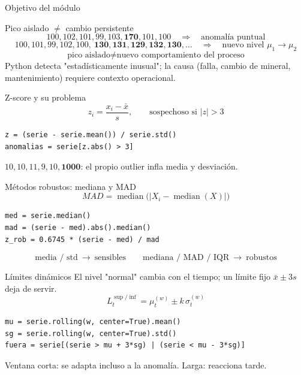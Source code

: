 



\begin{frame}{Objetivo del módulo}

\end{frame}

\begin{frame}{Pico aislado $\neq$ cambio persistente}
\[
100,102,101,99,103,\mathbf{170},101,100 \quad\Rightarrow\quad \text{anomalía puntual}
\]
\[
100,101,99,102,100,\ \mathbf{130,131,129,132,130,\dots} \quad\Rightarrow\quad \text{nuevo nivel } \mu_1\to\mu_2
\]
\[
\boxed{\text{pico aislado}\neq\text{nuevo comportamiento del proceso}}
\]
Python detecta "estadísticamente inusual"; la causa (falla, cambio de mineral,
mantenimiento) requiere contexto operacional.
\end{frame}

\begin{frame}[fragile]{Z-score y su problema}
\[
z_i=\frac{x_i-\bar{x}}{s},\qquad \text{sospechoso si } |z|>3
\]
\begin{lstlisting}
z = (serie - serie.mean()) / serie.std()
anomalias = serie[z.abs() > 3]
\end{lstlisting}
$10,10,11,9,10,\mathbf{1000}$: el propio outlier infla media y desviación.
\end{frame}

\begin{frame}[fragile]{Métodos robustos: mediana y MAD}
\[
MAD=\operatorname{median}\big(|X_i-\operatorname{median}(X)|\big)
\]
\begin{lstlisting}
med = serie.median()
mad = (serie - med).abs().median()
z_rob = 0.6745 * (serie - med) / mad
\end{lstlisting}
\[
\text{media / std}\ \to\ \text{sensibles}
\qquad
\text{mediana / MAD / IQR}\ \to\ \text{robustos}
\]
\end{frame}

\begin{frame}[fragile]{Límites dinámicos}
El nivel "normal" cambia con el tiempo; un límite fijo $\bar{x}\pm3s$ deja de servir.
\[
L_t^{\sup/\inf}=\mu_t^{(w)}\pm k\,\sigma_t^{(w)}
\]
\begin{lstlisting}
mu = serie.rolling(w, center=True).mean()
sg = serie.rolling(w, center=True).std()
fuera = serie[(serie > mu + 3*sg) | (serie < mu - 3*sg)]
\end{lstlisting}
Ventana corta: se adapta incluso a la anomalía. Larga: reacciona tarde.
\end{frame}

